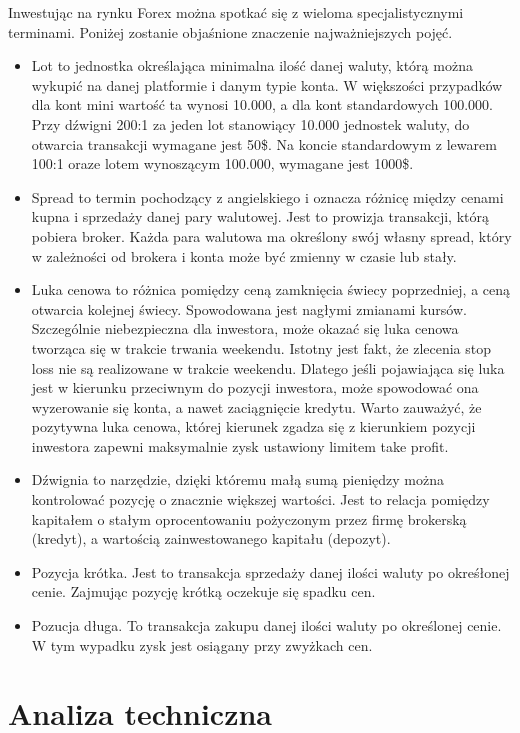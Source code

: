 \documentclass[pdflatex,11pt]{aghdpl}
\begin{document}
Inwestując na rynku Forex można spotkać się z wieloma specjalistycznymi terminami. Poniżej zostanie objaśnione znaczenie najważniejszych pojęć.
\begin{itemize}
\item Lot to jednostka określająca minimalna ilość danej waluty, którą można wykupić na danej platformie i danym typie konta. W większości przypadków dla kont mini wartość ta wynosi 10.000, a dla kont standardowych 100.000. Przy dźwigni 200:1 za jeden lot stanowiący 10.000 jednostek waluty, do otwarcia transakcji wymagane jest 50\$. Na koncie standardowym z lewarem 100:1 oraze lotem wynoszącym 100.000, wymagane jest 1000\$.
\item Spread to termin pochodzący z angielskiego i oznacza różnicę między cenami kupna i sprzedaży danej pary walutowej. Jest to prowizja transakcji, którą pobiera broker. Każda para walutowa ma określony swój własny spread, który w zależności od brokera i konta może być zmienny w czasie lub stały.
\item Luka cenowa to różnica pomiędzy ceną zamknięcia świecy poprzedniej, a ceną otwarcia kolejnej świecy. Spowodowana jest nagłymi zmianami kursów. Szczególnie niebezpieczna dla inwestora, może okazać się luka cenowa tworząca się w trakcie trwania weekendu. Istotny jest fakt, że zlecenia stop loss nie są realizowane w trakcie weekendu. Dlatego jeśli pojawiająca się luka jest w kierunku przeciwnym do pozycji inwestora, może spowodować ona wyzerowanie się konta, a nawet zaciągnięcie kredytu. Warto zauważyć, że pozytywna luka cenowa, której kierunek zgadza się z kierunkiem pozycji inwestora zapewni maksymalnie zysk ustawiony limitem take profit.  
\item Dźwignia to narzędzie, dzięki któremu małą sumą pieniędzy można kontrolować pozycję o znacznie większej wartości. Jest to relacja pomiędzy kapitałem o stałym oprocentowaniu pożyczonym przez firmę brokerską (kredyt), a wartością zainwestowanego kapitału (depozyt).
\item Pozycja krótka. Jest to transakcja sprzedaży danej ilości waluty po okreśłonej cenie. Zajmując pozycję krótką oczekuje się spadku cen. 
\item Pozucja długa. To transakcja zakupu danej ilości waluty po określonej cenie. W tym wypadku zysk jest osiągany przy zwyżkach cen.
\end{itemize}

\section{Analiza techniczna}
\label{sec:analizatechniczna}
\end{document}
